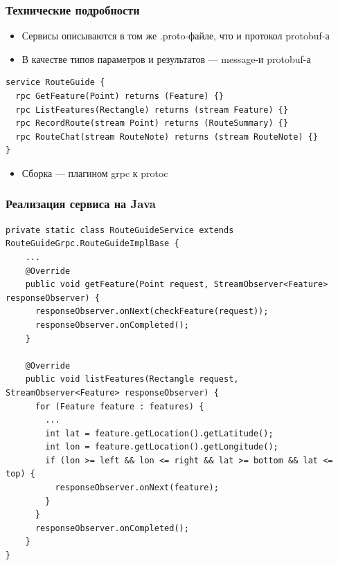 \documentclass{../../slides-style}
\begin{document}
    \begin{frame}[fragile]
        \frametitle{Технические подробности}
        \begin{itemize}
            \item Сервисы описываются в том же .proto-файле, что и протокол protobuf-а
            \item В качестве типов параметров и результатов --- message-и protobuf-а
        \end{itemize}
        \begin{verbatim}
service RouteGuide {
  rpc GetFeature(Point) returns (Feature) {}
  rpc ListFeatures(Rectangle) returns (stream Feature) {}
  rpc RecordRoute(stream Point) returns (RouteSummary) {}
  rpc RouteChat(stream RouteNote) returns (stream RouteNote) {}
}
        \end{verbatim}
        \begin{itemize}
            \item Сборка --- плагином grpc к protoc
        \end{itemize}
    \end{frame}

    \begin{frame}[fragile]
        \frametitle{Реализация сервиса на Java}
        \begin{scriptsize}
            \begin{verbatim}
private static class RouteGuideService extends RouteGuideGrpc.RouteGuideImplBase {
    ...
    @Override
    public void getFeature(Point request, StreamObserver<Feature> responseObserver) {
      responseObserver.onNext(checkFeature(request));
      responseObserver.onCompleted();
    }

    @Override
    public void listFeatures(Rectangle request, StreamObserver<Feature> responseObserver) {
      for (Feature feature : features) {
        ...
        int lat = feature.getLocation().getLatitude();
        int lon = feature.getLocation().getLongitude();
        if (lon >= left && lon <= right && lat >= bottom && lat <= top) {
          responseObserver.onNext(feature);
        }
      }
      responseObserver.onCompleted();
    }
}
            \end{verbatim}
        \end{scriptsize}
    \end{frame}
\end{document}
